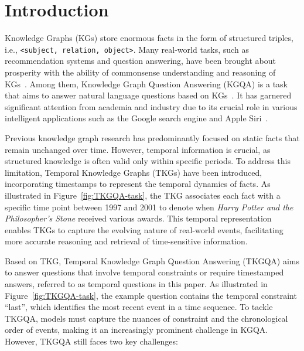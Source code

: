 \section{Introduction}
Knowledge Graphs (KGs) store enormous facts in the form of structured triples, i.e., \texttt{<subject, relation, object>}. Many real-world tasks, such as recommendation systems and question answering, have been brought about prosperity with the ability of commonsense understanding and reasoning of KGs~\cite{jiSurveyKnowledgeGraphs2022}.
Among them, Knowledge Graph Question Answering (KGQA) is a task that aims to answer natural language questions based on KGs~\cite{dong2015KGQA}. It has garnered significant attention from academia and industry due to its crucial role in various intelligent applications such as the Google search engine and Apple Siri~\cite{zhouCommonsenseKnowledgeAware2018}.


Previous knowledge graph research has predominantly focused on static facts that remain unchanged over time. However, temporal information is crucial, as structured knowledge is often valid only within specific periods. To address this limitation, Temporal Knowledge Graphs (TKGs) have been introduced, incorporating timestamps to represent the temporal dynamics of facts. As illustrated in Figure~\ref{fig:TKGQA-task}, the TKG associates each fact with a specific time point between 1997 and 2001 to denote when \textit{Harry Potter and the Philosopher’s Stone} received various awards. This temporal representation enables TKGs to capture the evolving nature of real-world events, facilitating more accurate reasoning and retrieval of time-sensitive information.

Based on TKG, Temporal Knowledge Graph Question Answering (TKGQA) aims to answer questions that involve temporal constraints or require timestamped answers, referred to as temporal questions in this paper. As illustrated in Figure~\ref{fig:TKGQA-task}, the example question contains the temporal constraint ``last'', which identifies the most recent event in a time sequence. To tackle TKGQA, models must capture the nuances of constraint and the chronological order of events, making it an increasingly prominent challenge in KGQA. However, TKGQA still faces two key challenges: 

